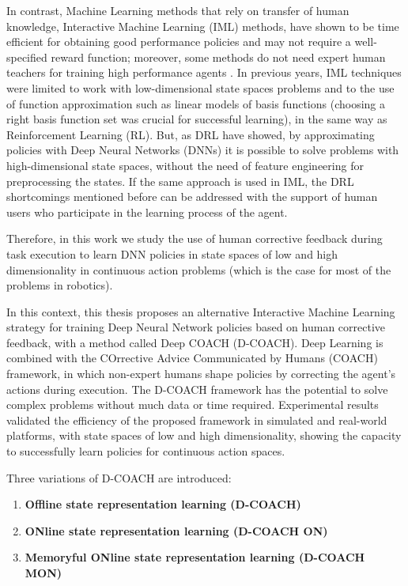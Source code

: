 In contrast, Machine Learning methods that rely on transfer of human knowledge, Interactive Machine Learning (IML) methods, have shown to be time efficient for obtaining good performance policies and may not require a well-specified reward function; moreover, some methods do not need expert human teachers for training high performance agents \cite{akrour2011preference,Knox:2009:ISA:1597735.1597738,Celemin2018AnInteractive}. In previous years, IML techniques were limited to work with low-dimensional state spaces problems and to the use of function approximation such as linear models of basis functions (choosing a right basis function set was crucial for successful learning), in the same way as Reinforcement Learning (RL). But, as DRL have showed, by approximating policies with Deep Neural Networks (DNNs) it is possible to solve problems with high-dimensional state spaces, without the need of feature engineering for preprocessing the states. If the same approach is used in IML, the DRL shortcomings mentioned before can be addressed with the support of human users who participate in the learning process of the agent.

Therefore, in this work we study the use of human corrective feedback during task execution to learn DNN policies in state spaces of low and high dimensionality in continuous action problems (which is the case for most of the problems in robotics).

In this context, this thesis proposes an alternative Interactive Machine Learning strategy for training Deep Neural Network policies based on human corrective feedback, with a method called Deep COACH (D-COACH). Deep Learning is combined with the COrrective Advice Communicated by Humans (COACH) framework, in which non-expert humans shape policies by correcting the agent’s actions during execution. The D-COACH framework has the potential to solve complex problems without much data or time required. Experimental results validated the efficiency of the proposed framework in simulated and real-world platforms, with state spaces of low and high dimensionality, showing the capacity to successfully learn policies for continuous action spaces. 

Three variations of D-COACH are introduced:

\begin{enumerate}
    \item \textbf{Offline state representation learning (D-COACH)}
    \item \textbf{ONline state representation learning (D-COACH ON)}
    \item \textbf{Memoryful ONline state representation learning (D-COACH MON)}
\end{enumerate}

